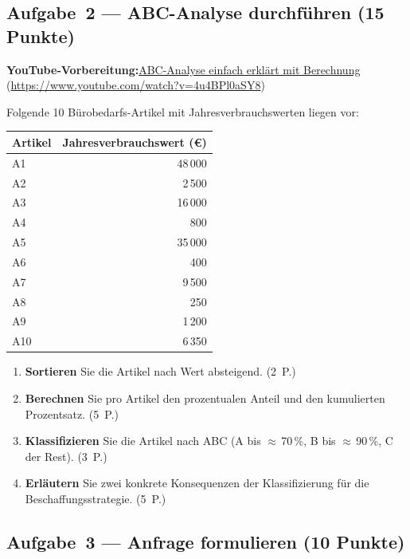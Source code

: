 \documentclass[11pt, a4paper]{article}
\begin{document}
\subsection*{Aufgabe~2 --- ABC-Analyse durchführen (15 Punkte)}

\noindent\textbf{\color{bfwAccent}YouTube-Vorbereitung:}\enspace \href{https://www.youtube.com/watch?v=4u4BPl0aSY8}{ABC-Analyse einfach erklärt mit Berechnung} (\url{https://www.youtube.com/watch?v=4u4BPl0aSY8})

\medskip
Folgende 10 Bürobedarfs-Artikel mit Jahres\-verbrauchswerten liegen vor:

\begin{center}
\begin{tabular}{lr}
\toprule
\textbf{Artikel} & \textbf{Jahresverbrauchswert (€)}\\
\midrule
A1 & 48\,000\\
A2 & 2\,500\\
A3 & 16\,000\\
A4 & 800\\
A5 & 35\,000\\
A6 & 400\\
A7 & 9\,500\\
A8 & 250\\
A9 & 1\,200\\
A10 & 6\,350\\
\bottomrule
\end{tabular}
\end{center}

\begin{enumerate}[label=(\alph*)]
  \item \textbf{Sortieren} Sie die Artikel nach Wert absteigend. \hfill (2~P.)
  \item \textbf{Berechnen} Sie pro Artikel den prozentualen Anteil und den kumulierten Prozentsatz. \hfill (5~P.)
  \item \textbf{Klassifizieren} Sie die Artikel nach ABC (A bis $\approx$\,70\,\%, B bis $\approx$\,90\,\%, C der Rest). \hfill (3~P.)
  \item \textbf{Erläutern} Sie zwei konkrete Konsequenzen der Klassifizierung für die Beschaffungsstrategie. \hfill (5~P.)
\end{enumerate}

\subsection*{Aufgabe~3 --- Anfrage formulieren (10 Punkte)}
\end{document}
